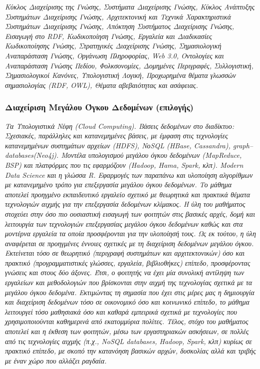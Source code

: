 \emph{Κύκλος Διαχείρισης της Γνώσης, Συστήματα Διαχείρισης Γνώσης,
Κύκλος Ανάπτυξης Συστημάτων Διαχείρισης Γνώσης, Αρχιτεκτονική και
Τεχνικά Χαρακτηριστικά Συστημάτων Διαχείρισης Γνώσης, Απόκτηση
Συστήματος Διαχείρισης Γνώσης, Εισαγωγή στο RDF, Κωδικοποίηση Γνώσης,
Εργαλεία και Διαδικασίες Κωδικοποίησης Γνώσης, Στρατηγικές Διαχείρισης
Γνώσης, Σημασιολογική Αναπαράσταση Γνώσης, Οργάνωση Πληροφορίας, Web
3.0, Οντολογίες και Αναπαράσταση Γνώσης Πεδίου, Φολκσονομίες, Δομημένες
Περιγραφές, Συλλογιστική, Σημασιολογικοί Κανόνες, Υπολογιστική Λογική,
Προχωρημένα θέματα γλωσσών σημασιολογίας (RDF, OWL), Θέματα αβεβαιότητας
και ασάφειας.}

\hypertarget{ux3b4ux3b9ux3b1ux3c7ux3b5ux3afux3c1ux3b9ux3c3ux3b7-ux3bcux3b5ux3b3ux3acux3bbux3bfux3c5-ux3ccux3b3ux3baux3bfux3c5-ux3b4ux3b5ux3b4ux3bfux3bcux3adux3bdux3c9ux3bd-ux3b5ux3c0ux3b9ux3bbux3bfux3b3ux3aeux3c2}{%
\subsubsection{Διαχείριση Μεγάλου Όγκου Δεδομένων
(επιλογής)}\label{ux3b4ux3b9ux3b1ux3c7ux3b5ux3afux3c1ux3b9ux3c3ux3b7-ux3bcux3b5ux3b3ux3acux3bbux3bfux3c5-ux3ccux3b3ux3baux3bfux3c5-ux3b4ux3b5ux3b4ux3bfux3bcux3adux3bdux3c9ux3bd-ux3b5ux3c0ux3b9ux3bbux3bfux3b3ux3aeux3c2}}

\emph{Τα Υπολογιστικά Νέφη (Cloud Computing). Βάσεις δεδομένων στο
διαδίκτυο: Σχεσιακές, παράλληλες και κατανεμημένες βάσεις, με έμφαση
στις τεχνολογίες κατανεμημένων συστημάτων αρχείων (HDFS), ΝοSQL (HBase,
Cassandra), graph--databases(Neo4j). Μοντέλα υπολογισμού μεγάλου όγκου
δεδομένων (MapReduce, BSP) και πλατφόρμες που τις εφαρμόζουν (Hadoop,
Hama, Spark, κλπ). Modern Data Science και η γλώσσα R. Εφαρμογές των
παραπάνω και υλοποίηση αλγορίθμων με κατανεμημένο τρόπο για επεξεργασία
μεγάλου όγκου δεδομένων. Το μάθημα αποτελεί προηγμένο εκπαιδευτικό
εργαλείο σχετικό με θεωρητικά και πρακτικά θέματα τεχνολογιών αιχμής για
την επεξεργασία δεδομένων κλίμακος. Η ύλη του μαθήματος στοχεύει στην
όσο πιο ουσιαστική εισαγωγή των φοιτητών στις βασικές αρχές, δομή και
λειτουργία των τεχνολογιών επεξεργασίας μεγάλου όγκου δεδομένων καθώς
και στα μοντέρνα εργαλεία τα οποία προσφέρονται για την υλοποίησή τους.
Ως εκ τούτου, η ύλη αναφέρεται σε προηγμένες έννοιες σχετικές με τη
διαχείριση δεδομένων μεγάλου όγκου. Εκτείνεται τόσο σε θεωρητικό
(περιγραφή συστημάτων και αρχιτεκτονικών) όσο και πρακτικό
(προγραμματιστικές γλώσσες, εργαλεία, βιβλιοθήκες) επίπεδο, προσφέροντας
γνώσεις και στους δύο άξονες. Έτσι, ο φοιτητής να έχει μία συνολική
αντίληψη των εργαλείων και μεθοδολογιών που βρίσκονται στην αιχμή της
τεχνολογίας σχετικά με τα μεγάλου όγκου δεδομένα. Εκτιμώντας τη σημασία
που έχει στις μέρες μας η δημιουργία και διαχείριση δεδομένων τόσο σε
οικονομικό όσο και κοινωνικό επίπεδο, το μάθημα λειτουργεί τόσο
μαθησιακά όσο και καθαρά εμπειρικά σχετικά με τεχνολογίες που
χρησιμοποιούνται καθημερινά από εκατομμύρια πολίτες. Τέλος, στόχο του
μαθήματος αποτελεί και η έκθεση των φοιτητών, μέσω των εργαστηριακών
ασκήσεων, σε πολλές από τις τεχνολογίες αιχμής (π.χ., NoSQL databases,
Hadoop, Spark, κλπ) κυρίως σε πρακτικό επίπεδο, με σκοπό την κατανόηση
βασικών αρχών, δυσκολίας αλλά και τριβής με έναν χώρο που αλλάζει
ραγδαία.}

